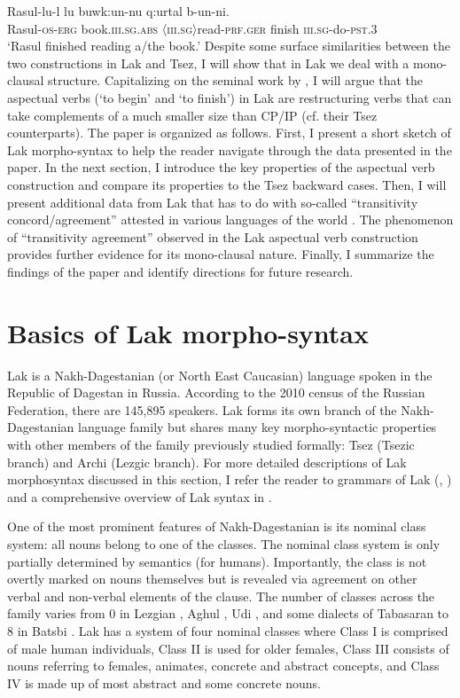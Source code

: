 \documentclass[output=paper]{langscibook}
\begin{document}
\ea\label{Rad3}
\gll Rasul-lu-l lu 	buwk:un-nu q:urtal b-un-ni.\\
Rasul-\textsc{os-erg} 		book.\textsc{iii.sg.abs} 	\textsc{〈iii.sg〉}read-\textsc{prf.ger}	finish 		\textsc{iii.sg}-do-\textsc{pst.3}\\
\glt ‘Rasul finished reading a/the book.’
\z
Despite some surface similarities between the two constructions in Lak and Tsez, I will show that in Lak we deal with a mono-clausal structure. Capitalizing on the seminal work by \citet{wurmbrand2001,Wurmbrand2004,Wurmbrand2007}, I will argue that the aspectual verbs (‘to begin’ and ‘to finish’) in Lak are restructuring verbs that can take complements of a much smaller size than CP/IP (cf. their Tsez counterparts).
The paper is organized as follows. First, I present a short sketch of Lak morpho-syntax to help the reader navigate through the data presented in the paper. In the next section, I introduce the key properties of the aspectual verb construction and compare its properties to the Tsez backward cases. Then, I will present additional data from Lak that has to do with so-called “transitivity concord/agreement” attested in various languages of the world \citep{Zariquiey2014}. The phenomenon of “transitivity agreement” observed in the Lak aspectual verb construction provides further evidence for its mono-clausal nature. Finally, I summarize the findings of the paper and identify directions for future research.

\section{Basics of Lak morpho-syntax}\label{Radsect2}\largerpage[2]
Lak is a Nakh-Dagestanian (or North East Caucasian) language spoken in the Republic of Dagestan in Russia. According to the 2010 census of the Russian Federation, there are 145,895 speakers. Lak forms its own branch of the Nakh-Da\-ge\-stan\-ian language family but shares many key morpho-syntactic properties with other members of the family previously studied formally: Tsez (Tsezic branch) and Archi (Lezgic branch). For more detailed descriptions of Lak morphosyntax discussed in this section, I refer the reader to  grammars of Lak (\citealt{Zhirkov1955}, \citealt{Murkelinskij1971}) and a comprehensive overview of Lak syntax in \citet{Kazenin2013}.

One of the most prominent features of Nakh-Dagestanian is its nominal class system: all nouns belong to one of the classes. The nominal class system is only partially determined by semantics (for humans). Importantly, the class is not overtly marked on nouns themselves but is revealed via agreement on other verbal and non-verbal elements of the clause. The number of classes across the family varies from 0 in Lezgian \citep{Haspelmath1993}, Aghul \citep{Magometov1970}, Udi \citep{Harris2002}, and some dialects of Tabasaran \citep{Magometov1965} to 8 in Batsbi \citep{Desheriev1967}. Lak has a system of four nominal classes where Class I is comprised of male human individuals, Class II is used for older females, Class III consists of nouns referring to females, animates, concrete and abstract concepts, and Class IV is made up of most abstract and some concrete nouns.
\end{document}
